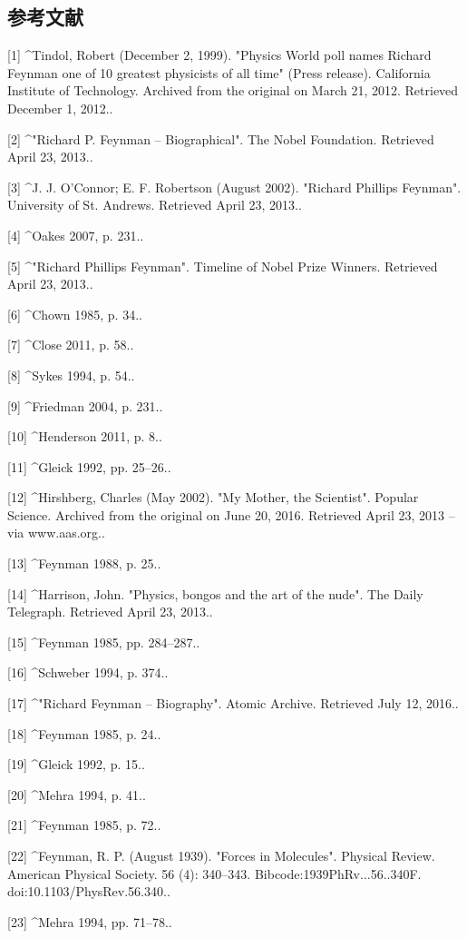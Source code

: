 \subsection{参考文献}
[1]
^Tindol, Robert (December 2, 1999). "Physics World poll names Richard Feynman one of 10 greatest physicists of all time" (Press release). California Institute of Technology. Archived from the original on March 21, 2012. Retrieved December 1, 2012..

[2]
^"Richard P. Feynman – Biographical". The Nobel Foundation. Retrieved April 23, 2013..

[3]
^J. J. O'Connor; E. F. Robertson (August 2002). "Richard Phillips Feynman". University of St. Andrews. Retrieved April 23, 2013..

[4]
^Oakes 2007, p. 231..

[5]
^"Richard Phillips Feynman". Timeline of Nobel Prize Winners. Retrieved April 23, 2013..

[6]
^Chown 1985, p. 34..

[7]
^Close 2011, p. 58..

[8]
^Sykes 1994, p. 54..

[9]
^Friedman 2004, p. 231..

[10]
^Henderson 2011, p. 8..

[11]
^Gleick 1992, pp. 25–26..

[12]
^Hirshberg, Charles (May 2002). "My Mother, the Scientist". Popular Science. Archived from the original on June 20, 2016. Retrieved April 23, 2013 – via www.aas.org..

[13]
^Feynman 1988, p. 25..

[14]
^Harrison, John. "Physics, bongos and the art of the nude". The Daily Telegraph. Retrieved April 23, 2013..

[15]
^Feynman 1985, pp. 284–287..

[16]
^Schweber 1994, p. 374..

[17]
^"Richard Feynman – Biography". Atomic Archive. Retrieved July 12, 2016..

[18]
^Feynman 1985, p. 24..

[19]
^Gleick 1992, p. 15..

[20]
^Mehra 1994, p. 41..

[21]
^Feynman 1985, p. 72..

[22]
^Feynman, R. P. (August 1939). "Forces in Molecules". Physical Review. American Physical Society. 56 (4): 340–343. Bibcode:1939PhRv...56..340F. doi:10.1103/PhysRev.56.340..

[23]
^Mehra 1994, pp. 71–78..

